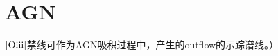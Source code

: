 \documentclass[../天体物理基础.tex]{subfiles}
\begin{document}
\section{AGN}
$\left[\mathrm{O\uppercase\expandafter{\romannumeral3}}\right]$禁线可作为AGN吸积过程中，产生的outflow的示踪谱线。）

\printbibliography
\end{document}
